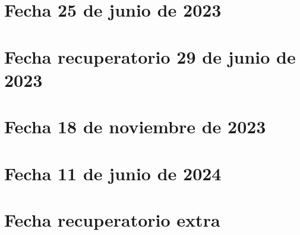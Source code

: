 \documentclass[10pt, a4paper]{report}
\theoremstyle{definition} %
\begin{document}
        \section{Fecha 25 de junio de 2023}
            

        \newpage
        \section{Fecha recuperatorio 29 de junio de 2023}
            

        \newpage
        \section{Fecha 18 de noviembre de 2023}
            

        \newpage
        \section{Fecha 11 de junio de 2024}
            

        \newpage
        \section{Fecha recuperatorio extra}
            
    
\end{document}
